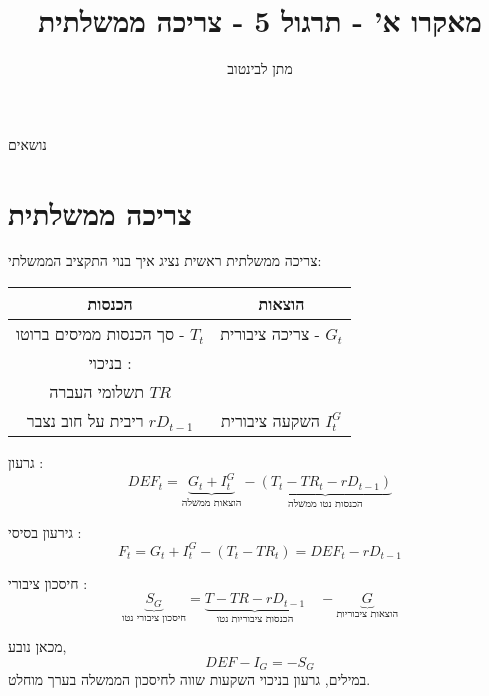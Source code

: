 \documentclass[usenames,dvipsnames]{beamer}
\title[]{{מאקרו א' - תרגול 5 - צריכה ממשלתית}}
\author{\texthebrew{ מתן לבינטוב}}
\institute[{{ אב"ג}}]{{ אוניברסיטת בן גוריון בנגב}}
\date{}
\begin{document}
\begin{RTL}
\begin{frame}
\titlepage
\end{frame}
\begin{frame}{נושאים}
    \tableofcontents
\end{frame}
\section{צריכה ממשלתית}
\begin{frame}[allowframebreaks]{צריכה ממשלתית}
    ראשית נציג איך בנוי התקציב הממשלתי:
    \begin{table}
    \centering
    \begin{tabular}{|c|c|} \hline 
         הכנסות& הוצאות\\ \hline 
         סך הכנסות ממיסים ברוטו  - $T_t$& צריכה ציבורית  - $G_t$\\ \hline 
         בניכוי : \\ תשלומי העברה $TR$ \\ ריבית על חוב נצבר $rD_{t-1}$&השקעה ציבורית $I_t^G$ \\ \hline
    \end{tabular}
    \end{table}
גרעון :
\begin{equation*}
    DEF_t = \underbrace{ G_t + I_t^G}_{\text{הוצאות ממשלה}} - \underbrace{(T_t -TR_t - rD_{t-1})}_{\text{הכנסות נטו ממשלה}}
\end{equation*}

גירעון בסיסי :
\begin{equation*}
    F_t = G_t + I_t^G - (T_t -TR_t) = DEF_t - rD_{t-1}
\end{equation*}
\begin{block}{חיסכון ציבורי :
    }
    \begin{equation*}
        \underbrace{ S_G}_{\text{חיסכון ציבורי נטו}} = \underbrace{T - TR -rD_{t-1}}_{\text{הכנסות ציבוריות נטו}}\quad  -\underbrace{G}_{\text{הוצאות ציבוריות}}
     \end{equation*}    
\end{block}

מכאן נובע, 
\begin{equation*}
    DEF - I_G = -S_G
\end{equation*}
במילים, גרעון בניכוי השקעות שווה לחיסכון הממשלה בערך מוחלט.

\end{frame}

\end{RTL}
\end{document}
